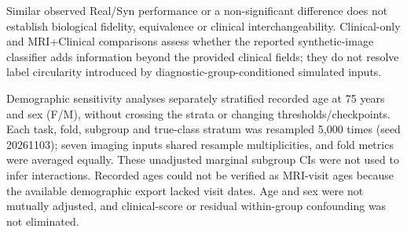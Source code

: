 Similar observed Real/Syn performance or a non-significant difference does not establish biological fidelity, equivalence or clinical interchangeability. Clinical-only and MRI+Clinical comparisons assess whether the reported synthetic-image classifier adds information beyond the provided clinical fields; they do not resolve label circularity introduced by diagnostic-group-conditioned simulated inputs.

Demographic sensitivity analyses separately stratified recorded age at 75 years and sex (F/M), without crossing the strata or changing thresholds/checkpoints. Each task, fold, subgroup and true-class stratum was resampled 5,000 times (seed 20261103); seven imaging inputs shared resample multiplicities, and fold metrics were averaged equally. These unadjusted marginal subgroup CIs were not used to infer interactions. Recorded ages could not be verified as MRI-visit ages because the available demographic export lacked visit dates. Age and sex were not mutually adjusted, and clinical-score or residual within-group confounding was not eliminated.
